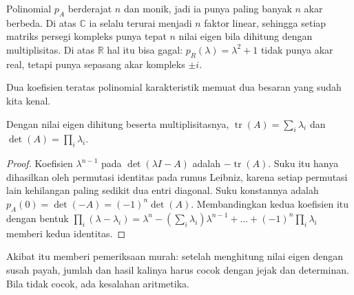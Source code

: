 Polinomial $p_{A}$ berderajat $n$ dan monik, jadi ia punya paling banyak $n$ akar berbeda. Di
atas $\mathbb{C}$ ia selalu terurai menjadi $n$ faktor linear, sehingga setiap matriks persegi
kompleks punya tepat $n$ nilai eigen bila dihitung dengan multiplisitas. Di atas $\mathbb{R}$ hal
itu bisa gagal: $p_{R}(\lambda)=\lambda^{2}+1$ tidak punya akar real, tetapi punya sepasang akar
kompleks $\pm i$.

Dua koefisien teratas polinomial karakteristik memuat dua besaran yang sudah kita kenal.

\begin{akibat}
Dengan nilai eigen dihitung beserta multiplisitasnya,
$\operatorname{tr}(A)=\sum_{i}\lambda_{i}$ dan $\det(A)=\prod_{i}\lambda_{i}$.
\end{akibat}

\begin{proof}
Koefisien $\lambda^{n-1}$ pada $\det(\lambda I-A)$ adalah $-\operatorname{tr}(A)$. Suku itu hanya
dihasilkan oleh permutasi identitas pada rumus Leibniz, karena setiap permutasi lain kehilangan
paling sedikit dua entri diagonal. Suku konstannya adalah $p_{A}(0)=\det(-A)=(-1)^{n}\det(A)$.
Membandingkan kedua koefisien itu dengan bentuk
$\prod_{i}(\lambda-\lambda_{i})=\lambda^{n}-(\sum_{i}\lambda_{i})\lambda^{n-1}+\dots+(-1)^{n}
\prod_{i}\lambda_{i}$ memberi kedua identitas.
\end{proof}

Akibat itu memberi pemeriksaan murah: setelah menghitung nilai eigen dengan susah payah, jumlah dan
hasil kalinya harus cocok dengan jejak dan determinan. Bila tidak cocok, ada kesalahan aritmetika.

